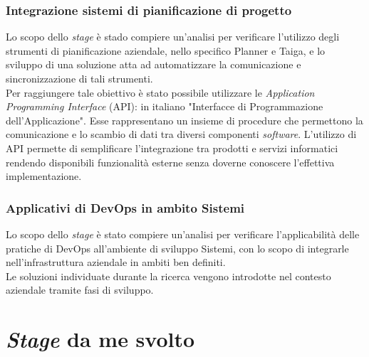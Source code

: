 \subsubsection*{Integrazione sistemi di pianificazione di progetto}
Lo scopo dello \emph{stage} è stado compiere un'analisi per verificare l'utilizzo degli strumenti di pianificazione aziendale, nello specifico Planner e Taiga, e lo sviluppo di una soluzione atta ad automatizzare la comunicazione e sincronizzazione di tali strumenti.\\
Per raggiungere tale obiettivo è stato possibile utilizzare le \emph{Application Programming Interface} (API): in italiano "Interfacce di Programmazione dell'Applicazione". Esse rappresentano un insieme di procedure che permettono la comunicazione e lo scambio di dati tra diversi componenti \emph{software}. L'utilizzo di API permette di semplificare l'integrazione tra prodotti e servizi informatici rendendo disponibili funzionalità esterne senza doverne conoscere l'effettiva implementazione.

\subsubsection*{Applicativi di DevOps in ambito Sistemi}
\label{stageDavide}
Lo scopo dello \emph{stage} è stato compiere un'analisi per verificare l'applicabilità delle pratiche di \gls{DevOps} all'ambiente di sviluppo \gls{Sistemi}, con lo scopo di integrarle nell'infrastruttura aziendale in ambiti ben definiti.\\
Le soluzioni individuate durante la ricerca vengono introdotte nel contesto aziendale tramite fasi di sviluppo. 


\section{\emph{Stage} da me svolto}
